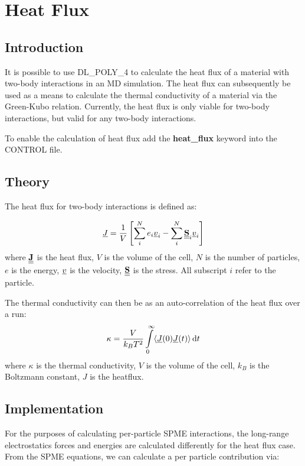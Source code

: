 \section{Heat Flux}

\subsection{Introduction}
It is possible to use DL\_POLY\_4 to calculate the heat flux of a material with two-body interactions in an MD simulation.  The heat flux can subsequently be used as a means to calculate the thermal conductivity of a material via the Green-Kubo relation. Currently, the heat flux is only viable for two-body interactions, but valid for any two-body interactions.

To enable the calculation of heat flux add the {\bf heat\_flux} keyword into the CONTROL file.

\subsection{Theory}
The heat flux for two-body interactions is defined as:

\begin{equation}
\mbox{$\underline{J}$} = \frac{1}{V} \left[ \sum\limits^{N}_{i} e_{i} \mbox{$\underline{v}$}_{i} - \sum\limits^{N}_{i} \mbox{$\underline{\underline{\bf S}}$}_{i} \mbox{$\underline{v}$}_{i} \right]
\end{equation}
where $\mbox{$\underline{\underline{\bf J}}$}$ is the heat flux, $V$ is the volume of the cell, $N$ is the number of particles, $e$ is the energy, $\mbox{$\underline{v}$}$ is the velocity, $\mbox{$\underline{\underline{\bf S}}$}$ is the stress. All subscript $i$ refer to the particle.

The thermal conductivity can then be as an auto-correlation of the heat flux over a run:
\begin{equation}
  \kappa = \frac{V}{k_{B} T^{2}} \int\limits_{0}^{\infty} \langle \mbox{$\underline{J}$}(0)  \mbox{$\underline{J}$}(t) \rangle \, \mathrm{d}t
\end{equation}
where $\kappa$ is the thermal conductivity, $V$ is the volume of the cell, $k_{B}$ is the Boltzmann constant, $J$ is the heatflux.

\subsection{Implementation}
For the purposes of calculating per-particle SPME interactions, the long-range electrostatics forces and energies are calculated differently for the heat flux case. From the SPME equations, we can calculate a per particle contribution via:

